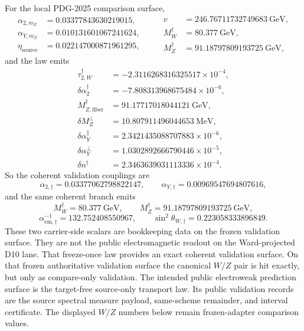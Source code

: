 \documentclass[11pt]{article}
\begin{document}
For the local PDG-2025 comparison surface,
\[
\begin{aligned}
\alpha_{2,m_Z}&=0.03377843630219015,\\
\alpha_{Y,m_Z}&=0.010131601067241624,\\
\eta_{\mathrm{source}}&=0.022147000871961295,
\end{aligned}
\qquad
\begin{aligned}
v&=246.76711732749683~\mathrm{GeV},\\
M_W^\dagger&=80.377~\mathrm{GeV},\\
M_Z^\dagger&=91.18797809193725~\mathrm{GeV},
\end{aligned}
\]
and the law emits
\[
\begin{aligned}
\tau_{2,W}^\dagger&=-2.3116268316325517\times10^{-4},\\
\delta\alpha_2^\dagger&=-7.808313968675484\times10^{-6},\\
M_{Z,\mathrm{fiber}}^\dagger&=91.17717018044121~\mathrm{GeV},\\
\delta M_Z^\perp&=10.807911496044653~\mathrm{MeV},\\
\delta\alpha_Y^\parallel&=2.3421435088707883\times10^{-6},\\
\delta\alpha_Y^\perp&=1.0302892666790446\times10^{-5},\\
\delta n^\dagger&=2.3463639031113336\times10^{-4}.
\end{aligned}
\]
So the coherent validation couplings are
\[
\alpha_{2,\dagger}=0.03377062798822147,
\qquad
\alpha_{Y,\dagger}=0.00969547694807616,
\]
and the same coherent branch emits
\[
M_W^\dagger=80.377~\mathrm{GeV},
\qquad
M_Z^\dagger=91.18797809193725~\mathrm{GeV},
\]
\[
\alpha_{\mathrm{em},\dagger}^{-1}=132.752408550967,
\qquad
\sin^2\theta_{W,\dagger}=0.223058333896849.
\]
These two carrier-side scalars are bookkeeping data on the frozen validation surface. They are not
the public electromagnetic readout on the Ward-projected D10 lane.
That freeze-once law provides an exact coherent validation surface. On that frozen authoritative
validation surface the canonical \(W/Z\) pair is hit exactly, but only as compare-only validation.
The intended public electroweak prediction surface is the target-free source-only transport law.
Its public validation records are the source spectral measure payload, same-scheme remainder, and
interval certificate. The displayed \(W/Z\) numbers below remain frozen-adapter comparison values.
\end{document}
